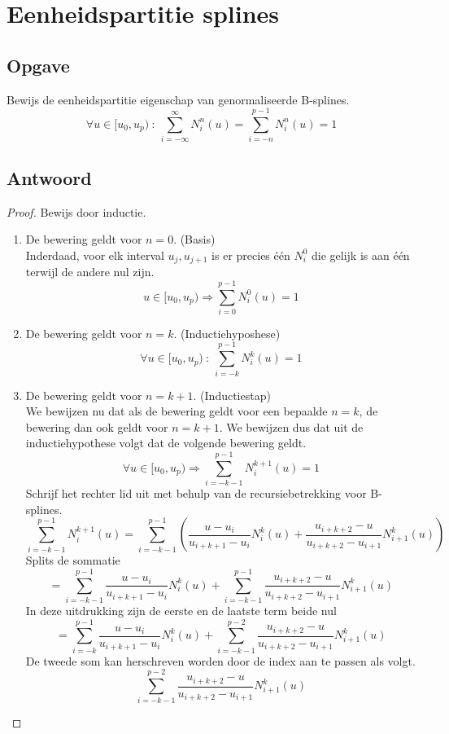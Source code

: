 \documentclass[examenvragen.tex]{subfiles}
\begin{document}
\section{Eenheidspartitie splines}
\subsection{Opgave}
Bewijs de eenheidspartitie eigenschap van genormaliseerde B-splines.
\[
\forall u \in [u_0,u_p)\ :\
\sum_{i=-\infty}^{\infty}N_{i}^{n}(u)
= \sum_{i=-n}^{p-1}N_{i}^{n}(u)
= 1
\]

\subsection{Antwoord}
\begin{proof}Bewijs door inductie.\\
\begin{enumerate}
\item De bewering geldt voor $n=0$. (Basis)\\
Inderdaad, voor elk interval $u_j,u_{j+1}$ is er precies \'e\'en $N_{i}^{0}$ die gelijk is aan \'e\'en terwijl de andere nul zijn.
\[
u \in [u_0,u_p) \Rightarrow
\sum_{i=0}^{p-1}N_{i}^{0}(u)
= 1
\]
\item De bewering geldt voor $n=k$. (Inductiehyposhese)
\[
\forall u \in [u_0,u_p)\ :\
\sum_{i=-k}^{p-1}N_{i}^{k}(u)
= 1
\]
\item De bewering geldt voor $n=k+1$. (Inductiestap)\\
We bewijzen nu dat als de bewering geldt voor een bepaalde $n=k$, de bewering dan ook geldt voor $n=k+1$.
We bewijzen dus dat uit de inductiehypothese volgt dat de volgende bewering geldt.
\[
\forall u \in [u_0,u_p) \Rightarrow
\sum_{i=-k-1}^{p-1}N_{i}^{k+1}(u)
= 1
\]
Schrijf het rechter lid uit met behulp van de recursiebetrekking voor B-splines.
\[
\sum_{i=-k-1}^{p-1}N_{i}^{k+1}(u)
= \sum_{i=-k-1}^{p-1}
\left(
\frac{u-u_i}{u_{i+k+1}-u_i}					N_{i}^{k}(u)
+ \frac{u_{i+k+2}-u}{u_{i+k+2}-u_{i+1}}			N_{i+1}^{k}(u)
\right)
\]
Splits de sommatie
\[
=
\sum_{i=-k-1}^{p-1}
\frac{u-u_i}{u_{i+k+1}-u_i}					N_{i}^{k}(u)
+ 
\sum_{i=-k-1}^{p-1}
\frac{u_{i+k+2}-u}{u_{i+k+2}-u_{i+1}}			N_{i+1}^{k}(u)
\]
In deze uitdrukking zijn de eerste en de laatste term beide nul
\[
=
\sum_{i=-k}^{p-1}
\frac{u-u_i}{u_{i+k+1}-u_i}					N_{i}^{k}(u)
+ 
\sum_{i=-k-1}^{p-2}
\frac{u_{i+k+2}-u}{u_{i+k+2}-u_{i+1}}			N_{i+1}^{k}(u)
\]
De tweede som kan herschreven worden door de index aan te passen als volgt.
\[
\sum_{i=-k-1}^{p-2}
\frac{u_{i+k+2}-u}{u_{i+k+2}-u_{i+1}}			N_{i+1}^{k}(u)
\]
\end{enumerate}
\end{proof}
\end{document}
